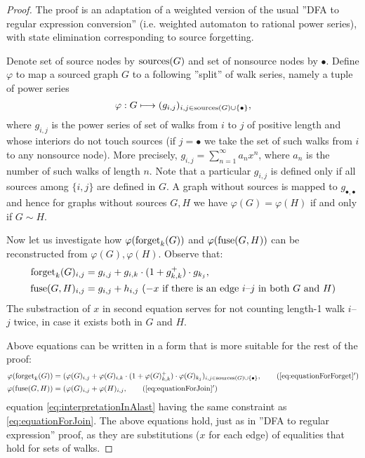 \begin{proof}
        The proof is an adaptation of a weighted version of the usual ''DFA to regular expression conversion'' (i.e. weighted automaton to rational power series), with state elimination corresponding to source forgetting.
    
    Denote set of source nodes by $\operatorname{sources}(G)$ and set of nonsource nodes by $\bullet$. Define $\varphi$ to map a sourced graph $G$ to a following ''split'' of walk series, namely a tuple of power series
    $$
    	\varphi: G \longmapsto (g_{i,j})_{i,j \in \operatorname{sources}(G) \cup \{\bullet\}},
    $$
    where $g_{i,j}$ is the power series of set of walks from $i$ to $j$ of positive length and whose interiors do not touch sources (if $j=\bullet$ we take the set of such walks from $i$ to any nonsource node). More precisely, $g_{i,j} = \sum_{n=1}^{\infty} a_n x^n$, where $a_n$ is the number of such walks of length $n$. Note that a particular $g_{i,j}$ is defined only if all sources among $\{i,j\}$ are defined in $G$. A graph without sources is mapped to $g_{\bullet, \bullet}$ and hence for graphs without sources $G, H$ we have $\varphi(G) = \varphi(H)$ if and only if $G \sim H$.
    
    Now let us investigate how $\varphi(\operatorname{forget}_k(G))$ and $\varphi(\operatorname{fuse}(G, H))$ can be reconstructed from $\varphi(G), \varphi(H)$.
    Observe that:
    \begin{align}\label{eq:equationForForget}
    	\operatorname{forget}_k(G)_{i,j} &= g_{i,j} + g_{i,k}\cdot(1 + g_{k,k}^+)\cdot g_{k_j},\\
    	\operatorname{fuse}(G, H)_{i,j} &= g_{i,j} + h_{i,j} \ (- x \text{ if there is an edge } i\text{--}j \text{ in both } G \text{ and } H)
    	\label{eq:equationForJoin}
    \end{align}
    The substraction of $x$ in second equation serves for not counting length-1 walk $i$--$j$ twice, in case it exists both in $G$ and $H$.
    
    Above equations can be written in a form that is more suitable for the rest of the proof:
    \begin{align}
    	\label{eq:interpretationInAfirst}%
   		\varphi(\forget_k(G)) &= (\varphi(G)_{i,j} + \varphi(G)_{i,k}\cdot(1 + \varphi(G)_{k,k}^+)\cdot \varphi(G)_{k_j})_{i,j \in \allv{G}}, \tag{\ref*{eq:equationForForget}${}^\prime$}\\
    	\varphi(\join(G, H)) &= (\varphi(G)_{i,j} + \varphi(H)_{i,j},
    	\label{eq:interpretationInAlast} \tag{\ref*{eq:equationForJoin}${}^\prime$}
    \end{align}
    equation \eqref{eq:interpretationInAlast} having the same constraint as \eqref{eq:equationForJoin}.
    The above equations hold, just as in ''DFA to regular expression'' proof, as they are substitutions ($x$ for each edge) of equalities that hold for sets of walks.
    

\end{proof}
